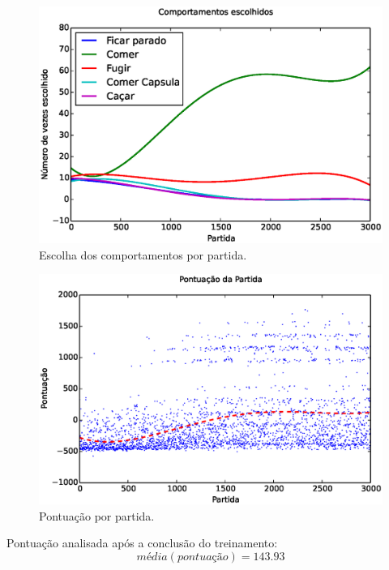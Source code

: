 \documentclass{beamer}
\begin{document}
\begin{frame}
\begin{figure}[H]
    \centering
    \includegraphics[width=\linewidth]{images/5_behaviors_small_map/chosen_behaviors_pol}
    \caption{Escolha dos comportamentos por partida.}
    \label{img:5ComportamentosMapaPequeno:ComportamentosEscolhidosPolinomio}
\end{figure}
\end{frame}


\begin{frame}
\begin{figure}[h]
    \centering
    \includegraphics[width=0.7\linewidth]{images/5_behaviors_small_map/match_scores____pol}
    \caption{Pontuação por partida.}
    \label{img:5ComportamentosMapaPequeno:PontuacaoPorPartida}
\end{figure}

Pontuação analisada após a conclusão do treinamento:
$$ \textit{média} \left( \textit{pontuação} \right) = 143.93 $$
\end{frame}
\end{document}
